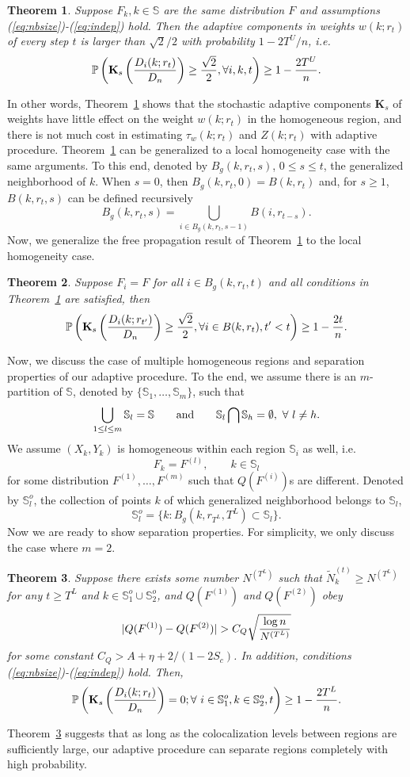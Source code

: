 \documentclass[10pt,twocolumn,twoside]{IEEEtran}
\newtheorem{theorem}{Theorem}
\def\SS{\mathbb{S}}
\def\PP{\mathbb{P}}
\def\bK{\mathbf K}
\begin{document}
\begin{theorem}
\label{thm:globalhomo}
Suppose $F_k, k\in\SS$ are the same distribution $F$ and assumptions (\ref{eq:nbsize})-(\ref{eq:indep}) hold. 
Then the adaptive components in weights $w(k;r_t)$ of every step $t$ is larger than $\sqrt{2}/2$ with probability $1-2T^U/n$, i.e.
$$
\PP\left(\bK_s\left(D_i(k;r_{t}) \over D_n \right)\ge {\sqrt{2}\over 2},\forall i,k,t\right)\ge 1-{2T^U\over n}.
$$
\end{theorem}
In other words, Theorem~\ref{thm:globalhomo} shows that the stochastic adaptive components $\bK_s$ of weights have little effect on the weight $w(k;r_t)$ in the homogeneous region, and there is not much cost in estimating $\tau_w(k;r_t)$ and $Z(k;r_t)$ with adaptive procedure. Theorem~\ref{thm:globalhomo} can be generalized to a local homogeneity case with the same arguments. To this end, denoted by $B_g(k,r_t,s)$, $0\le s\le t$, the generalized neighborhood of $k$. When $s=0$, then $B_g(k,r_t,0)=B(k,r_t)$ and, for $s\ge 1$, $B(k,r_t,s)$ can be defined recursively
$$
B_g(k,r_t,s)=\bigcup_{i\in B_g(k,r_t,s-1)} B(i,r_{t-s}).
$$
Now, we generalize the free propagation result of Theorem~\ref{thm:globalhomo} to the local homogeneity case.
\begin{theorem}
\label{thm:localhomo}
Suppose $F_i=F$ for all $i\in B_g(k,r_t,t)$ and all conditions in Theorem~\ref{thm:globalhomo} are satisfied, then 
$$
\PP\left(\bK_s\left(D_i(k;r_{t'}) \over D_n \right)\ge {\sqrt{2}\over 2},\forall i\in B(k,r_t),t'<t\right)\ge 1-{2t\over n}.
$$
\end{theorem}

Now, we discuss the case of multiple homogeneous regions and separation properties of our adaptive procedure. To the end, we assume there is an $m$-partition of $\SS$, denoted by $\{\SS_1,\ldots,\SS_m\}$, such that
$$
\bigcup_{1\le l\le m}\SS_l=\SS\qquad{\rm and}\qquad \SS_l\bigcap\SS_h=\emptyset,\ \forall\ l\ne h.
$$
We assume $(X_k,Y_k)$ is homogeneous within each region $\SS_i$ as well, i.e.
$$
F_k=F^{(l)},\qquad k\in \SS_l
$$
for some distribution $F^{(1)},\ldots, F^{(m)}$ such that $Q(F^{(i)})$s are different. Denoted by $\SS_l^{o}$, the collection of points $k$ of which generalized neighborhood belongs to $\SS_l$,
$$
\SS_l^{o}=\{k:B_g(k,r_{T^L},T^L)\subset \SS_l\}.
$$
Now we are ready to show separation properties. For simplicity, we only discuss the case where $m=2$.
\begin{theorem}
\label{thm:separate}
Suppose there exists some number $N^{(T^L)}$ such that $\tilde{N}_k^{(t)}\ge N^{(T^L)}$ for any $t\ge T^L$ and $k\in \SS_1^{o}\cup \SS_2^{o}$, and $Q(F^{(1)})$ and $Q(F^{(2)})$ obey
$$
|Q(F^{(1)})-Q(F^{(2)})|>C_Q\sqrt{\log n\over N^{(T^L)}}
$$
for some constant $C_Q>A+\eta+2/(1-2S_c)$. In addition, conditions (\ref{eq:nbsize})-(\ref{eq:indep}) hold.
Then,
$$
\PP\left(\bK_s\left(D_i(k;r_{t}) \over D_n \right)=0;\forall\ i\in \SS_1^{o},k\in \SS_2^{o}, t\right)\ge 1-{2T^L\over n}.
$$
\end{theorem}
Theorem~\ref{thm:separate} suggests that as long as the colocalization levels between regions are sufficiently large, our adaptive procedure can separate regions completely with high probability.
\end{document}
